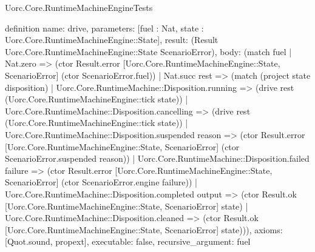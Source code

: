 \begin{lexlean}{Uorc.Core.RuntimeMachineEngineTests}
\begin{semanticmodule}
definition{
  name: drive,
  parameters: [fuel : Nat, state : Uorc.Core.RuntimeMachineEngine::State],
  result: (Result Uorc.Core.RuntimeMachineEngine::State ScenarioError),
  body: (match fuel
    | Nat.zero => (ctor Result.error [Uorc.Core.RuntimeMachineEngine::State, ScenarioError] (ctor ScenarioError.fuel))
    | Nat.succ rest => (match (project state disposition)
      | Uorc.Core.RuntimeMachine::Disposition.running => (drive rest (Uorc.Core.RuntimeMachineEngine::tick state))
      | Uorc.Core.RuntimeMachine::Disposition.cancelling => (drive rest (Uorc.Core.RuntimeMachineEngine::tick state))
      | Uorc.Core.RuntimeMachine::Disposition.suspended reason => (ctor Result.error [Uorc.Core.RuntimeMachineEngine::State, ScenarioError] (ctor ScenarioError.suspended reason))
      | Uorc.Core.RuntimeMachine::Disposition.failed failure => (ctor Result.error [Uorc.Core.RuntimeMachineEngine::State, ScenarioError] (ctor ScenarioError.engine failure))
      | Uorc.Core.RuntimeMachine::Disposition.completed output => (ctor Result.ok [Uorc.Core.RuntimeMachineEngine::State, ScenarioError] state)
      | Uorc.Core.RuntimeMachine::Disposition.cleaned => (ctor Result.ok [Uorc.Core.RuntimeMachineEngine::State, ScenarioError] state))),
  axioms: [Quot.sound, propext],
  executable: false,
  recursive_argument: fuel
}


\end{semanticmodule}
\end{lexlean}
